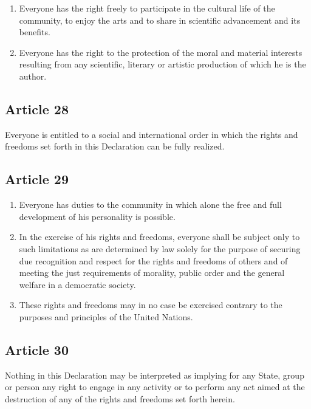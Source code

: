 \documentclass[
  titlepage,
  openright,
  DIV=calc,
  toc=listof,
  listof=nochaptergap]{scrbook}
\begin{document}
\begin{enumerate}
\def\labelenumi{\arabic{enumi}.}
\item
  Everyone has the right freely to participate in the cultural life of
  the community, to enjoy the arts and to share in scientific
  advancement and its benefits.
\item
  Everyone has the right to the protection of the moral and material
  interests resulting from any scientific, literary or artistic
  production of which he is the author.
\end{enumerate}

\subsection{Article 28}\label{article-28-3}

Everyone is entitled to a social and international order in which the
rights and freedoms set forth in this Declaration can be fully realized.

\subsection{Article 29}\label{article-29-3}

\begin{enumerate}
\def\labelenumi{\arabic{enumi}.}
\item
  Everyone has duties to the community in which alone the free and full
  development of his personality is possible.
\item
  In the exercise of his rights and freedoms, everyone shall be subject
  only to such limitations as are determined by law solely for the
  purpose of securing due recognition and respect for the rights and
  freedoms of others and of meeting the just requirements of morality,
  public order and the general welfare in a democratic society.
\item
  These rights and freedoms may in no case be exercised contrary to the
  purposes and principles of the United Nations.
\end{enumerate}

\subsection{Article 30}\label{article-30-3}

Nothing in this Declaration may be interpreted as implying for any
State, group or person any right to engage in any activity or to perform
any act aimed at the destruction of any of the rights and freedoms set
forth herein.
\end{document}
